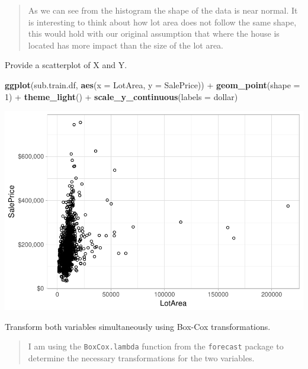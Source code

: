 \documentclass[]{article}
\newenvironment{Shaded}{\begin{snugshade}}{\end{snugshade}}
\newcommand{\KeywordTok}[1]{\textcolor[rgb]{0.13,0.29,0.53}{\textbf{{#1}}}}
\newcommand{\DataTypeTok}[1]{\textcolor[rgb]{0.13,0.29,0.53}{{#1}}}
\newcommand{\DecValTok}[1]{\textcolor[rgb]{0.00,0.00,0.81}{{#1}}}
\newcommand{\StringTok}[1]{\textcolor[rgb]{0.31,0.60,0.02}{{#1}}}
\newcommand{\NormalTok}[1]{{#1}}
\begin{document}
\begin{quote}
As we can see from the histogram the shape of the data is near normal.
It is interesting to think about how lot area does not follow the same
shape, this would hold with our original assumption that where the house
is located has more impact than the size of the lot area.
\end{quote}

Provide a scatterplot of X and Y.

\begin{Shaded}
\begin{Highlighting}[]
\KeywordTok{ggplot}\NormalTok{(sub.train.df, }\KeywordTok{aes}\NormalTok{(}\DataTypeTok{x =} \NormalTok{LotArea, }\DataTypeTok{y =} \NormalTok{SalePrice)) +}\StringTok{ }\KeywordTok{geom_point}\NormalTok{(}\DataTypeTok{shape =} \DecValTok{1}\NormalTok{) +}\StringTok{ }
\StringTok{    }\KeywordTok{theme_light}\NormalTok{() +}\StringTok{ }\KeywordTok{scale_y_continuous}\NormalTok{(}\DataTypeTok{labels =} \NormalTok{dollar)}
\end{Highlighting}
\end{Shaded}

\includegraphics{Final_Project_files/figure-latex/scatter plot-1.pdf}

Transform both variables simultaneously using Box-Cox transformations.

\begin{quote}
I am using the \texttt{BoxCox.lambda} function from the
\texttt{forecast} package to determine the necessary transformations for
the two variables.
\end{quote}
\end{document}

